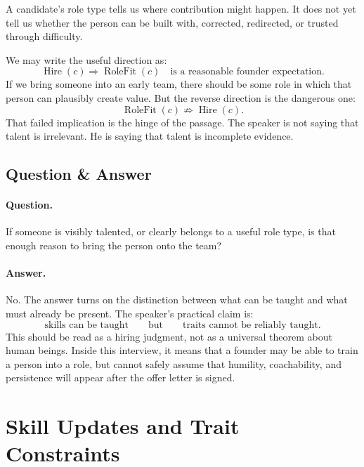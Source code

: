 A candidate's role type tells us where contribution might happen. It does not yet tell us whether the person can be built with, corrected, redirected, or trusted through difficulty.

We may write the useful direction as:
\begin{equation}
  \operatorname{Hire}(c)
  \Rightarrow
  \operatorname{RoleFit}(c)
  \quad\text{is a reasonable founder expectation.}
\end{equation}
If we bring someone into an early team, there should be some role in which that person can plausibly create value. But the reverse direction is the dangerous one:
\begin{equation}
  \operatorname{RoleFit}(c)
  \nRightarrow
  \operatorname{Hire}(c).
\end{equation}
That failed implication is the hinge of the passage. The speaker is not saying that talent is irrelevant. He is saying that talent is incomplete evidence.

\subsection{Question \& Answer}

\paragraph{Question.}
If someone is visibly talented, or clearly belongs to a useful role type, is that enough reason to bring the person onto the team?

\paragraph{Answer.}
No. The answer turns on the distinction between what can be taught and what must already be present. The speaker's practical claim is:
\begin{equation}
  \text{skills can be taught}
  \qquad\text{but}\qquad
  \text{traits cannot be reliably taught.}
\end{equation}
This should be read as a hiring judgment, not as a universal theorem about human beings. Inside this interview, it means that a founder may be able to train a person into a role, but cannot safely assume that humility, coachability, and persistence will appear after the offer letter is signed.

\section{Skill Updates and Trait Constraints}

